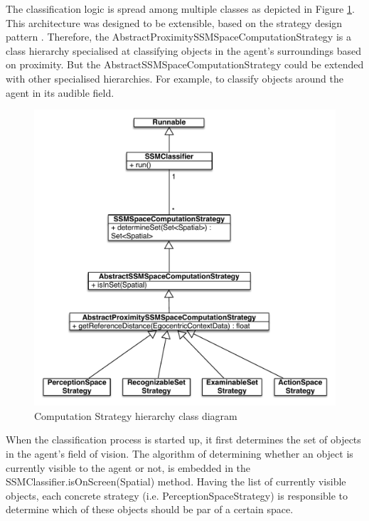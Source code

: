 The classification logic is spread among multiple classes as depicted in Figure \ref{fig:impl_computation_strategy}. This architecture was designed to be extensible, based on the strategy design pattern \cite{gamma1994design}. Therefore, the AbstractProximitySSMSpaceComputationStrategy is a class hierarchy specialised at classifying objects in the agent's surroundings based on proximity. But the AbstractSSMSpaceComputationStrategy could be extended with other specialised hierarchies. For example, to classify objects around the agent in its audible field.
\begin{figure}[H]
	\centering
	\includegraphics[width=\linewidth]{gfx/Chapter4/computation_strategy}
	\caption{Computation Strategy hierarchy class diagram}
	\label{fig:impl_computation_strategy}
\end{figure}

When the classification process is started up, it first determines the set of objects in the agent's field of vision. The algorithm of determining whether an object is currently visible to the agent or not, is embedded in the SSMClassifier.isOnScreen(Spatial) method. Having the list of currently visible objects, each concrete strategy (i.e. PerceptionSpaceStrategy) is responsible to determine which of these objects should be par of a certain space.\\

